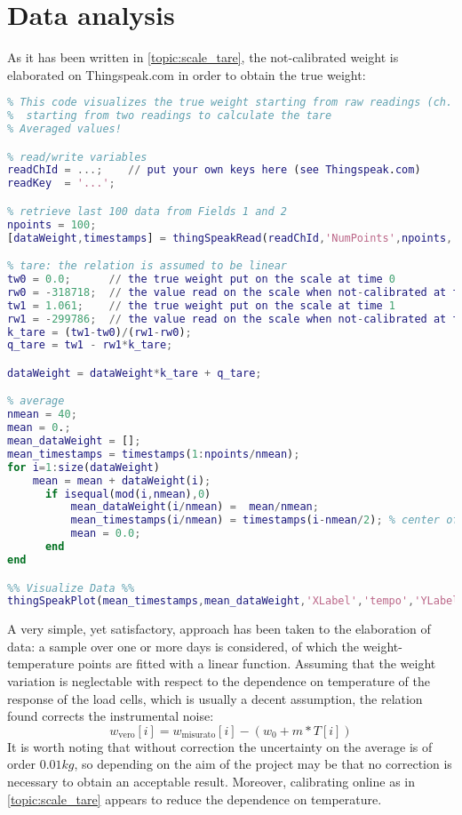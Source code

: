 \section{Data analysis}
As it has been written in \autoref{topic:scale_tare}, the not-calibrated weight is elaborated on Thingspeak.com in order to obtain the true weight:
 
\label{code:ts:tare}
\begin{lstlisting}[language=Matlab]
%%%%%%%%%%%%%%%%%%%%%%%
% This code visualizes the true weight starting from raw readings (ch. 4),
%  starting from two readings to calculate the tare
% Averaged values!

% read/write variables 
readChId = ...;    // put your own keys here (see Thingspeak.com)
readKey  = '...';

% retrieve last 100 data from Fields 1 and 2
npoints = 100;
[dataWeight,timestamps] = thingSpeakRead(readChId,'NumPoints',npoints,'Fields',4);

% tare: the relation is assumed to be linear
tw0 = 0.0;      // the true weight put on the scale at time 0
rw0 = -318718;  // the value read on the scale when not-calibrated at time 0 
tw1 = 1.061;    // the true weight put on the scale at time 1
rw1 = -299786;  // the value read on the scale when not-calibrated at time 0 
k_tare = (tw1-tw0)/(rw1-rw0);
q_tare = tw1 - rw1*k_tare;

dataWeight = dataWeight*k_tare + q_tare;

% average
nmean = 40;
mean = 0.;
mean_dataWeight = [];
mean_timestamps = timestamps(1:npoints/nmean);
for i=1:size(dataWeight)
    mean = mean + dataWeight(i);
      if isequal(mod(i,nmean),0)
          mean_dataWeight(i/nmean) =  mean/nmean;
          mean_timestamps(i/nmean) = timestamps(i-nmean/2); % center of interval
          mean = 0.0;
      end       
end

%% Visualize Data %%
thingSpeakPlot(mean_timestamps,mean_dataWeight,'XLabel','tempo','YLabel','peso (kg)','Title','Peso arnia','Legend',{'peso'});
\end{lstlisting}

A very simple, yet satisfactory, approach has been taken to the elaboration of data: a sample over one or more days is considered, of which the weight-temperature points are fitted with a linear function. Assuming that the weight variation is neglectable with respect to the dependence on temperature of the response of the load cells, which is usually a decent assumption, the relation found corrects the instrumental noise:
\[ w_{\mathrm{vero}}[i] = w_{\mathrm{misurato}}[i] - (w_0 + m*T[i]) \]
It is worth noting that without correction the uncertainty on the average is of order $0.01 kg$, so depending on the aim of the project may be that no correction is necessary to obtain an acceptable result. Moreover, calibrating online as in \autoref{topic:scale_tare} appears to reduce the dependence on temperature.

